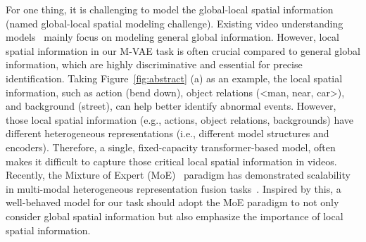For one thing, it is challenging to model the global-local spatial information (named global-local spatial modeling challenge). Existing video understanding models~\cite{video-llava,videochat,pandagpt} mainly focus on modeling general global information. However, local spatial information in our M-VAE task is often crucial compared to general global information, which are highly discriminative and essential for precise identification. Taking Figure~\ref{fig:abstract} (a) as an example, 
the local spatial information, such as action (bend down), object relations (<man, near, car>), and background (street), can help better identify abnormal events. However, those local spatial information (e.g., actions, object relations, backgrounds) have different heterogeneous representations (i.e., different model structures and encoders). Therefore, a single, fixed-capacity transformer-based model, often makes it difficult to capture those critical local spatial information in videos. Recently, the Mixture of Expert (MoE)~\cite{onellm,onellm2} paradigm has demonstrated scalability in multi-modal heterogeneous representation fusion tasks~\cite{onellm,onellm2,nestedmoe}. Inspired by this, a well-behaved model for our task should adopt the MoE paradigm to not only consider global spatial information but also emphasize the importance of local spatial information.

  
